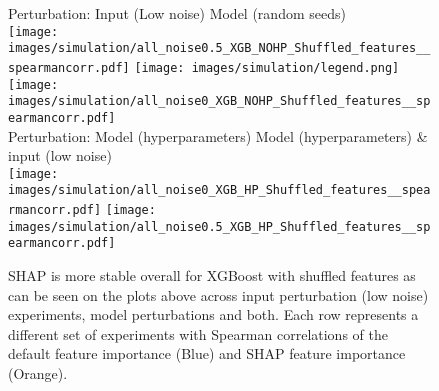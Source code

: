  \begin{figure*}[h]
  \centering
  \scriptsize
  Perturbation: Input (Low noise) \hspace{2.2cm} Model (random seeds)\\
  \texttt{[image: images/simulation/all\_noise0.5\_XGB\_NOHP\_Shuffled\_features\_\_spearmancorr.pdf]}
  \texttt{[image: images/simulation/legend.png]}
  \texttt{[image: images/simulation/all\_noise0\_XGB\_NOHP\_Shuffled\_features\_\_spearmancorr.pdf]} \\
  
  Perturbation: Model (hyperparameters)\hspace{1.7cm} Model (hyperparameters) \& input (low noise) \\
  \texttt{[image: images/simulation/all\_noise0\_XGB\_HP\_Shuffled\_features\_\_spearmancorr.pdf]}
  \hspace*{10ex}
  \texttt{[image: images/simulation/all\_noise0.5\_XGB\_HP\_Shuffled\_features\_\_spearmancorr.pdf]}
  \caption{SHAP is more stable overall for XGBoost with shuffled features as can be seen on the plots above across input perturbation (low noise) experiments, model perturbations and both. Each row represents a different set of experiments with Spearman correlations of the default feature importance (Blue) and SHAP feature importance (Orange).}
  \label{fig:xgb_shuffled}

\end{figure*}

  
